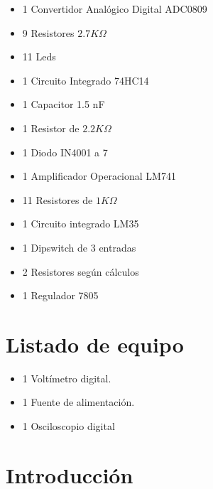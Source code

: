 \documentclass[12pt]{article}
\begin{document}
		\begin{multicols}{2}
	
	\begin{itemize}
	    \item 1 Convertidor Analógico Digital ADC0809
        \item 9 Resistores $2.7 K\Omega$
        \item 11 Leds
        \item 1	Circuito Integrado 74HC14
        \item 1	Capacitor 1.5 nF
        \item 1	Resistor de $2.2 K\Omega$ 
        \item 1	Diodo IN4001 a 7
        \end{itemize}

	  
	  \columnbreak
	  
	  \begin{itemize}
	      \item 1 Amplificador Operacional LM741
	      \item 11 Resistores de $1 K\Omega$
        \item 1 Circuito integrado LM35
        \item 1 Dipswitch de 3 entradas
        \item 2	Resistores según cálculos
        \item 1	Regulador 7805

	  \end{itemize}
	  
	  \end{multicols}
	  
	  \section{Listado de equipo}
	\begin{itemize}
	    \item 1	Voltímetro digital.
        \item 1	Fuente de alimentación.
        \item 1	Osciloscopio digital

	    \end{itemize}
	    
	

	\section{Introducción}
\end{document}
